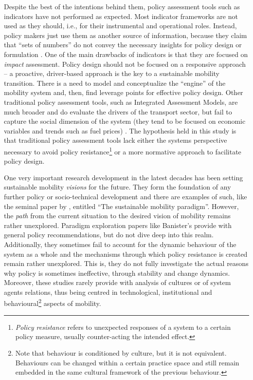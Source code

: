 Despite the best of the intentions behind them, policy assessment tools such as indicators have not performed as expected. Most indicator frameworks are not used as they should, i.e., for their instrumental and operational roles. Instead, policy makers just use them as another source of information, because they claim that ``sets of numbers'' do not convey the necessary insights for policy design or formulation \parencite{gudmundsson2013_SomeuseLittleinfluence}. One of the main drawbacks of indicators is that they are focused on \emph{impact} assessment. Policy design should not be focused on a responsive approach -- a proactive, driver-based approach is the key to a sustainable mobility transition. There is a need to model and conceptualize the ``engine'' of the mobility system and, then, find leverage points for effective policy design. Other traditional policy assessment tools, such as Integrated Assessment Models, are much broader and do evaluate the drivers of the transport sector, but fail to capture the social dimension of the system (they tend to be focused on economic variables and trends such as fuel prices) \parencite{creutzig2015_EvolvingNarrativesLow}. The hypothesis held in this study is that traditional policy assessment tools lack either the systems perspective necessary to avoid policy resistance\footnote{\emph{Policy resistance} refers to unexpected responses of a system to a certain policy measure, usually counter-acting the intended effect.} or a more normative approach to facilitate policy design.

One very important research development in the latest decades has been setting sustainable mobility \emph{visions} for the future. They form the foundation of any further policy or socio-technical development and there are examples of such, like the seminal paper by \textcite{banister2008_sustainablemobilityparadigm}, entitled ``The sustainable mobility paradigm''. However, the \emph{path} from the current situation to the desired vision of mobility remains rather unexplored. Paradigm exploration papers like Banister's provide with general policy recommendations, but do not dive deep into this realm. Additionally, they sometimes fail to account for the dynamic behaviour of the system as a whole and the mechanisms through which policy resistance is created remain rather unexplored. This is, they do not fully investigate the actual reasons why policy is sometimes ineffective, through stability and change dynamics. Moreover, these studies rarely provide with analysis of cultures or of system agents relations, thus being centred in technological, institutional and behavioural\footnote{Note that behaviour is conditioned by culture, but it is not equivalent. Behaviours can be changed within a certain practice space and still remain embedded in the same cultural framework of the previous behaviour.} aspects of mobility.

